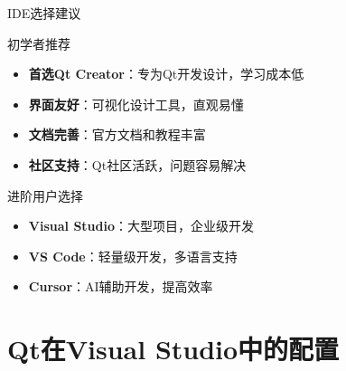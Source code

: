 \documentclass[UTF8,aspectratio=169]{beamer}
\begin{document}
\begin{frame}{IDE选择建议}
    \begin{ytublock}{初学者推荐}
        \begin{itemize}
            \item \textbf{首选Qt Creator}：专为Qt开发设计，学习成本低
            \item \textbf{界面友好}：可视化设计工具，直观易懂
            \item \textbf{文档完善}：官方文档和教程丰富
            \item \textbf{社区支持}：Qt社区活跃，问题容易解决
        \end{itemize}
    \end{ytublock}

    \begin{ytublock}{进阶用户选择}
        \begin{itemize}
            \item \textbf{Visual Studio}：大型项目，企业级开发
            \item \textbf{VS Code}：轻量级开发，多语言支持
            \item \textbf{Cursor}：AI辅助开发，提高效率
        \end{itemize}
    \end{ytublock}
\end{frame}

\section{Qt在Visual Studio中的配置}
\end{document}

